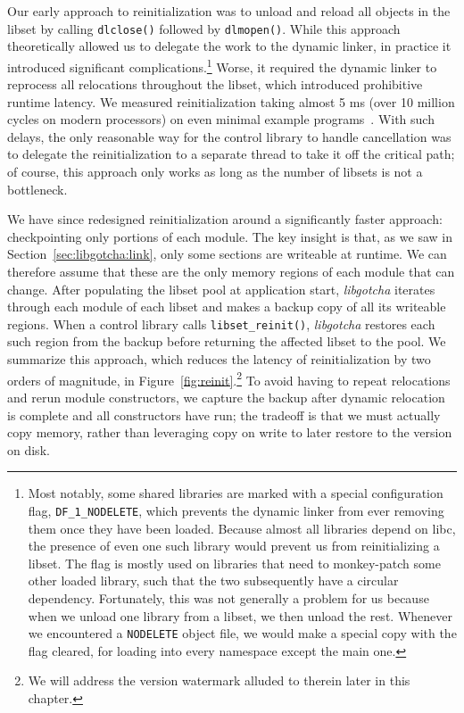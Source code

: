 Our early approach to reinitialization was to unload and reload all objects in the
libset by calling \texttt{dlclose()} followed by \texttt{dlmopen()}.  While this
approach theoretically allowed us to delegate the work to the dynamic linker, in
practice it introduced significant complications.\footnote{Most notably, some shared
libraries are marked with a special configuration flag, \texttt{DF\_1\_NODELETE},
which prevents the dynamic linker from ever removing them once they have been loaded.
Because almost all libraries depend on libc, the presence of even one such library
would prevent us from reinitializing a libset.  The flag is mostly used on libraries
that need to monkey-patch some other loaded library, such that the two subsequently
have a circular dependency.  Fortunately, this was not generally a problem for us
because when we unload one library from a libset, we then unload the rest.  Whenever
we encountered a \texttt{NODELETE} object file, we would make a special copy with the
flag cleared, for loading into every namespace except the main one.}  Worse, it
required the dynamic linker to reprocess all relocations throughout the libset, which
introduced prohibitive runtime latency.  We measured reinitialization taking almost 5
ms (over 10 million cycles on modern processors) on even minimal example
programs~\cite{boucher:atc2020}.  With such delays, the only reasonable way for the
control library to handle cancellation was to delegate the reinitialization to a
separate thread to take it off the critical path; of course, this approach only works
as long as the number of libsets is not a bottleneck.

We have since redesigned reinitialization around a significantly faster approach:\@
checkpointing only portions of each module.  The key insight is that, as we saw in
Section~\ref{sec:libgotcha:link}, only some sections are writeable at runtime.  We
can therefore assume that these are the only memory regions of each module that can
change.  After populating the libset pool at application start, \textit{libgotcha}
iterates through each module of each libset and makes a backup copy of all its
writeable regions.  When a control library calls \texttt{libset\_reinit()},
\textit{libgotcha} restores each such region from the backup before returning the
affected libset to the pool.  We summarize this approach, which reduces the
latency of reinitialization by two orders of magnitude, in
Figure~\ref{fig:reinit}.\footnote{We will address the version watermark alluded to
therein later in this chapter.}  To avoid having to repeat relocations and rerun
module constructors, we capture the backup after dynamic relocation is complete and
all constructors have run; the tradeoff is that we must actually copy memory,
rather than leveraging copy on write to later restore to the version on disk.

